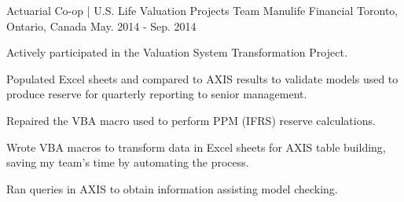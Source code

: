\begin{cventries}
  \cventry
    {Actuarial Co-op | U.S. Life Valuation Projects Team} %
    {Manulife Financial} %
    {Toronto, Ontario, Canada} %
    {May. 2014 - Sep. 2014} %
    {
      \begin{cvitems} %
        \item {Actively participated in the Valuation System Transformation Project.}\\  \begin{cvitems} 
          \item {Populated Excel sheets and compared to AXIS results to validate models used to produce reserve for quarterly reporting to senior management.}
          \item {Repaired the VBA macro used to perform PPM (IFRS) reserve calculations.}
          \item {Wrote VBA macros to transform data in Excel sheets for AXIS table building, saving my team’s time by automating the process.}
          \item {Ran queries in AXIS to obtain information assisting model checking.}\\
        \end{cvitems}
      \end{cvitems}
    }
\end{cventries}
